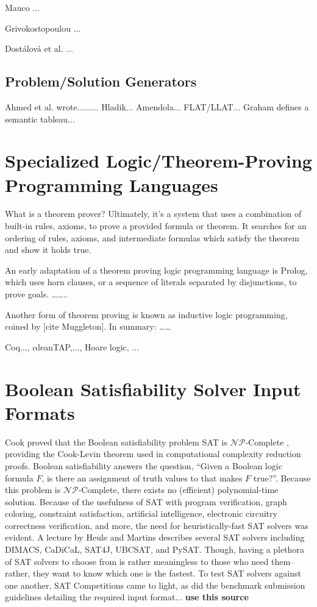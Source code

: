 \documentclass[ms]{uncgdissertationexp2}
\theoremstyle{plain}
\theoremstyle{definition}
\theoremstyle{remark}
\begin{document}
Mauco \cite{mauco}...

Grivokostopoulou \cite{grivokostopoulou}...

Dost\'alov\'a et al. \cite{organon}...

\subsection{Problem/Solution Generators}
Ahmed et al. wrote.........
Hladik...
Amendola...
FLAT/LLAT... Graham defines a semantic tableau...

\section{Specialized Logic/Theorem-Proving Programming Languages}
What is a theorem prover? Ultimately, it's a system that uses a combination of built-in rules, axioms, to prove a provided formula or theorem. It searches for an ordering of rules, axioms, and intermediate formulas which satisfy the theorem and show it holds true. 

An early adaptation of a theorem proving logic programming language is Prolog, which uses horn clauses, or a sequence of literals separated by disjunctions, to prove goals. ……..

Another form of theorem proving is known as inductive logic programming, coined by [cite Muggleton]. In summary: ……

Coq..., $\alpha$\textsf{lean}TAP,..., Hoare logic, ...

\section{Boolean Satisfiability Solver Input Formats} 
Cook proved that the Boolean satisfiability problem SAT is $\mathcal{NP}$-Complete \cite{cook}, providing the Cook-Levin theorem used in computational complexity reduction proofs. Boolean satisfiability answers the question, ``Given a Boolean logic formula $F$, is there an assignment of truth values to that makes $F$ true?''. Because this problem is $\mathcal{NP}$-Complete, there exists no (efficient) polynomial-time solution. Because of the usefulness of SAT with program verification, graph coloring, constraint satisfaction, artificial intelligence, electronic circuitry correctness verification, and more, the need for heuristically-fast SAT solvers was evident. A lecture by Heule and Martins \cite{satsolvers} describes several SAT solvers including DIMACS, CaDiCaL, SAT4J, UBCSAT, and PySAT. Though, having a plethora of SAT solvers to choose from is rather meaningless to those who need them--rather, they want to know which one is the fastest. To test SAT solvers against one another, SAT Competitions came to light, as did the benchmark submission guidelines detailing the required input format... \textbf{use this source \cite{satbenchmark}}
\end{document}
